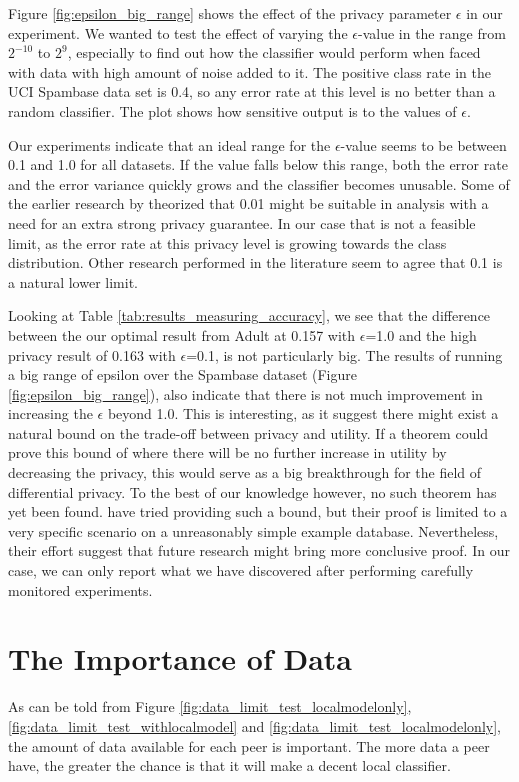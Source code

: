  
Figure \ref{fig:epsilon_big_range} shows the effect of the privacy parameter $\epsilon$ in our experiment. We wanted to test the effect of varying the $\epsilon$-value in the range from $2^{-10}$ to $2^9$, especially to find out how the classifier would perform when faced with data with high amount of noise added to it. The positive class rate in the UCI Spambase data set is 0.4, so any error rate at this level is no better than a random classifier. The plot shows how sensitive output is to the values of $\epsilon$.

Our experiments indicate that an ideal range for the $\epsilon$-value seems to be between 0.1 and 1.0 for all datasets. If the value falls below this range, both the error rate and the error variance quickly grows and the classifier becomes unusable. Some of the earlier research by \cite{dwork2008differential} theorized that 0.01 might be suitable in analysis with a need for an extra strong privacy guarantee. In our case that is not a feasible limit, as the error rate at this privacy level is growing towards the class distribution. Other research performed in the literature \cite{pathak2010diffprivhomo,kellaris2013groupingSmoothing,hsu2014economicEpsilon} seem to agree that 0.1 is a natural lower limit.   

Looking at Table \ref{tab:results_measuring_accuracy}, we see that the difference between the our optimal result from Adult at 0.157 with $\epsilon$=1.0 and the high privacy result of 0.163 with $\epsilon$=0.1, is not particularly big. The results of running a big range of epsilon over the Spambase dataset (Figure \ref{fig:epsilon_big_range}), also indicate that there is not much improvement in increasing the $\epsilon$ beyond 1.0. This is interesting, as it suggest there might exist a natural bound on the trade-off between privacy and utility. If a theorem could prove this bound of where there will be no further increase in utility by decreasing the privacy, this would serve as a big breakthrough for the field of differential privacy. To the best of our knowledge however, no such theorem has yet been found. \cite{lee2011epsilonBound} have tried providing such a bound, but their proof is limited to a very specific scenario on a unreasonably simple example database. Nevertheless, their effort suggest that future research might bring more conclusive proof. In our case, we can only report what we have discovered after performing carefully monitored experiments.   


\section{The Importance of Data} \label{importance_of_data}
As can be told from Figure \ref{fig:data_limit_test_localmodelonly}, \ref{fig:data_limit_test_withlocalmodel} and \ref{fig:data_limit_test_localmodelonly}, the amount of data available for each peer is important. The more data a peer have, the greater the chance is that it will make a decent local classifier. 


